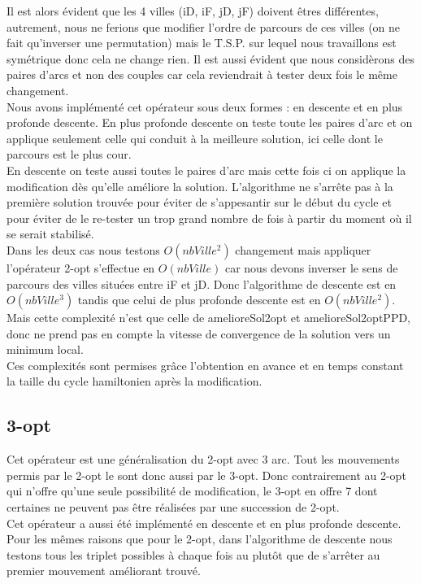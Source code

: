 \documentclass[12pt,a4paper]{article}
\begin{document}
Il est alors évident que les 4 villes (iD, iF, jD, jF) doivent êtres différentes, autrement, nous ne ferions que modifier l'ordre de parcours de ces villes (on ne fait qu'inverser une permutation) mais le T.S.P. sur lequel nous travaillons est symétrique donc cela ne change rien. Il est aussi évident que nous considèrons des paires d'arcs et non des couples car cela reviendrait à tester deux fois le même changement.\\

Nous avons implémenté cet opérateur sous deux formes : en descente et en plus profonde descente.
En plus profonde descente on teste toute les paires d'arc et on applique seulement celle qui conduit à la meilleure solution, ici celle dont le parcours est le plus cour.\\

En descente on teste aussi toutes le paires d'arc mais cette fois ci on applique la modification dès qu'elle améliore la solution. L'algorithme ne s’arrête pas à la première solution trouvée pour éviter de s'appesantir sur le début du cycle et pour éviter de le re-tester un trop grand nombre de fois à partir du moment où il se serait stabilisé.\\

Dans les deux cas nous testons $O(nbVille^2)$ changement mais appliquer l'opérateur 2-opt s’effectue en $O(nbVille)$ car nous devons inverser le sens de parcours des villes situées entre iF et jD. Donc l'algorithme de descente est en $O(nbVille^3)$ tandis que celui de plus profonde descente est en $O(nbVille^2)$. Mais cette complexité n'est que celle de amelioreSol2opt et amelioreSol2optPPD, donc ne prend pas en compte la vitesse de convergence de la solution vers un minimum local.\\
Ces complexités sont permises grâce l'obtention en avance et en temps constant la taille du cycle hamiltonien après la modification.
 
\subsection{3-opt}
Cet opérateur est une généralisation du 2-opt avec 3 arc. Tout les mouvements permis par le 2-opt le sont donc aussi par le 3-opt. Donc contrairement au 2-opt qui n'offre qu'une seule possibilité de modification, le 3-opt en offre 7 dont certaines ne peuvent pas être réalisées par une succession de 2-opt.\\

Cet opérateur a aussi été implémenté en descente et en plus profonde descente.\\
Pour les mêmes raisons que pour le 2-opt, dans l'algorithme de descente nous testons tous les triplet possibles à chaque fois au plutôt que de s’arrêter au premier mouvement améliorant trouvé.\\
\end{document}
